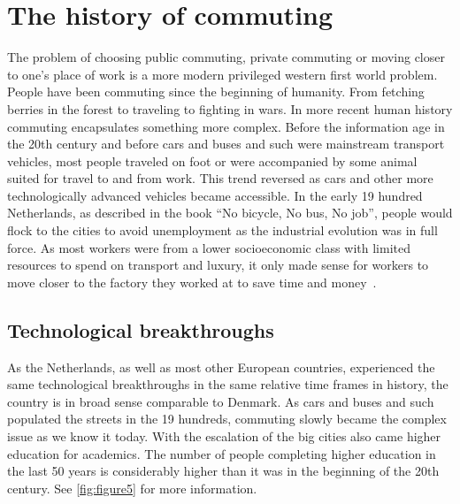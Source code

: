 \section{The history of commuting}\label{sec:the-history-of-commuting}

The problem of choosing public commuting, private commuting or moving closer to one's place of work is a more modern
privileged western first world problem.
People have been commuting since the beginning of humanity.
From fetching berries in the forest to traveling to fighting in wars.
In more recent human history commuting encapsulates something more complex.
Before the information age in the 20th century and before cars and buses and such were mainstream transport vehicles,
most people traveled on foot or were accompanied by some animal suited for travel to and from work.
This trend reversed as cars and other more technologically advanced vehicles became accessible.
In the early 19 hundred Netherlands, as described in the book ``No bicycle, No bus, No job'', people would flock to the
cities to avoid unemployment as the industrial evolution was in full force.
As most workers were from a lower socioeconomic class with limited resources to spend on transport and luxury, it only
made sense for workers to move closer to the factory they worked at to save time and money~\cite{bek2022}.

\subsection{Technological breakthroughs}\label{subsec:technological-breakthroughs}

As the Netherlands, as well as most other European countries, experienced the same technological breakthroughs in the
same relative time frames in history, the country is in broad sense comparable to Denmark.
As cars and buses and such populated the streets in the 19 hundreds, commuting slowly became the complex issue as we
know it today.
With the escalation of the big cities also came higher education for academics.
The number of people completing higher education in the last 50 years is considerably higher than it was in the
beginning of the 20th century.
See \ref{fig:figure5} for more information.

